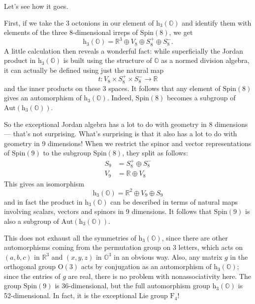 \documentclass{article}
\begin{document}
Let's see how it goes.

First, if we take the 3 octonions in our element of
\(\mathrm{h}_3(\mathbb{O})\) and identify them with elements of the
three 8-dimensional irreps of \(\mathrm{Spin}(8)\), we get
\[\mathrm{h}_3(\mathbb{O}) = \mathbb{R}^3\oplus V_8\oplus S_8^+\oplus S_8^-.\]
A little calculation then reveals a wonderful fact: while superficially
the Jordan product in \(\mathrm{h}_3(\mathbb{O})\) is built using the
structure of \(\mathbb{O}\) as a normed division algebra, it can
actually be defined using just the natural map
\[t\colon V_8\times S_8^+\times S_8^-\to\mathbb{R}\] and the inner
products on these 3 spaces. It follows that any element of
\(\mathrm{Spin}(8)\) gives an automorphism of
\(\mathrm{h}_3(\mathbb{O})\). Indeed, \(\mathrm{Spin}(8)\) becomes a
subgroup of \(\mathrm{Aut}(\mathrm{h}_3(\mathbb{O}))\).

So the exceptional Jordan algebra has a lot to do with geometry in 8
dimensions --- that's not surprising. What's surprising is that it also
has a lot to do with geometry in 9 dimensions! When we restrict the
spinor and vector representations of \(\mathrm{Spin}(9)\) to the
subgroup \(\mathrm{Spin}(8)\), they split as follows: \[
  \begin{aligned}
    S_9 &= S_8^+\oplus S_8^-
  \\V_9 &= \mathbb{R}\oplus V_8
  \end{aligned}
\] This gives an isomorphism
\[\mathrm{h}_3(\mathbb{O}) = \mathbb{R}^2\oplus V_9\oplus S_9\] and in
fact the product in \(\mathrm{h}_3(\mathbb{O})\) can be described in
terms of natural maps involving scalars, vectors and spinors in 9
dimensions. It follows that \(\mathrm{Spin}(9)\) is also a subgroup of
\(\mathrm{Aut}(\mathrm{h}_3(\mathbb{O}))\).

This does not exhaust all the symmetries of
\(\mathrm{h}_3(\mathbb{O})\), since there are other automorphisms coming
from the permutation group on 3 letters, which acts on \((a,b,c)\) in
\(\mathbb{R}^3\) and \((x,y,z)\) in \(\mathbb{O}^3\) in an obvious way.
Also, any matrix \(g\) in the orthogonal group \(\mathrm{O}(3)\) acts by
conjugation as an automorphism of \(\mathrm{h}_3(\mathbb{O})\); since
the entries of \(g\) are real, there is no problem with nonassociativity
here. The group \(\mathrm{Spin}(9)\) is 36-dimensional, but the full
automorphism group \(\mathrm{h}_3(\mathbb{O})\) is 52-dimensional. In
fact, it is the exceptional Lie group \(\mathrm{F}_4\)!
\end{document}
